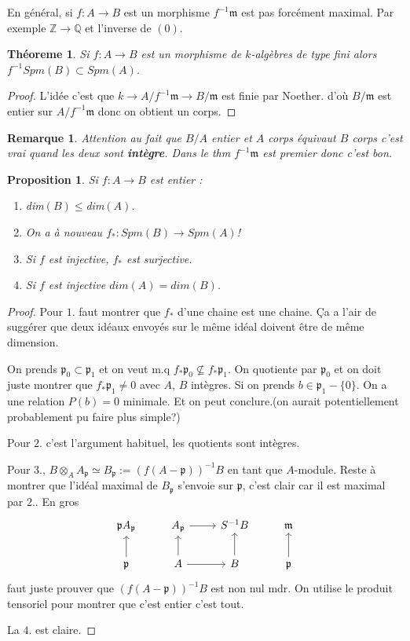 \documentclass[a4paper,12pt]{book}
\newcommand{\Z}{\mathbb{Z}}
\newcommand{\Q}{\mathbb{Q}}
\newcommand{\m}{\mathfrak{m}}
\newcommand{\p}{\mathfrak{p}}
\theoremstyle{plain}
\newtheorem{thm}[subsection]{Théoreme}
\newtheorem{prop}[subsection]{Proposition}
\newtheorem{rem}{Remarque}
\theoremstyle{definition}
\theoremstyle{remark}
\begin{document}
En général, si $f\colon A \to B$ est un morphisme
$f^{-1}\m$ est pas forcément maximal. Par exemple
$\Z\to \Q$ et l'inverse de $(0)$. 
\begin{thm}
    Si $f\colon A\to B$ est un morphisme de $k$-algèbres
    de type fini alors $f^{-1}Spm(B)\subset Spm(A)$.
\end{thm}
\begin{proof}
    L'idée c'est que $k\to A/f^{-1}\m\to B/\m$ est finie
    par Noether. d'où $B/\m$ est entier sur $A/f^{-1}\m$
    donc on obtient un corps.
\end{proof}
\begin{rem}
    Attention au fait que $B/A$ entier et $A$ corps équivaut $B$ corps
    c'est vrai quand les deux sont \textbf{intègre}. Dans le thm
    $f^{-1}\m$ est premier donc c'est bon.
\end{rem}
\begin{prop}
    Si $f\colon A\to B$ est entier :
    \begin{enumerate}
	\item dim$(B)\leq$dim$(A)$.
	\item On a à nouveau $f_*\colon Spm(B)\to Spm(A)$!
	\item Si $f$ est injective, $f_*$ est surjective.
	\item Si $f$ est injective $dim(A)=dim(B)$.
    \end{enumerate}
\end{prop}
\begin{proof}
    Pour $1.$ faut montrer que $f_*$ d'une chaine est une chaine.
    Ça a l'air de suggérer que deux idéaux envoyés sur le même idéal
    doivent être de même dimension.


    On prends $\p_0\subset \p_1$ et on veut m.q 
    $f_*\p_0\nsubseteq f_*\p_1$. On quotiente par $\p_0$ et on doit
    juste montrer que $f_* \p_1\ne 0$ avec $A$, $B$ intègres. Si 
    on prends $b\in \p_1-\{0\}$. On a une relation $P(b)=0$ minimale.
    Et on peut conclure.(on aurait potentiellement probablement pu faire
    plus simple?)

    Pour $2.$ c'est l'argument habituel, les quotients sont intègres.

    Pour $3.$, $B\otimes_A A_{\p}\simeq B_{\p}:=(f(A-\p))^{-1}B$ en tant
    que $A$-module. Reste à montrer que l'idéal maximal de $B_{\p}$
    s'envoie sur $\p$, c'est clair car il est maximal par $2.$. En gros
\[\begin{tikzcd}
	{\p A_{\p}} & {A_{\p}} & {S^{-1}B} & \m \\
	\p & A & B & \p
	\arrow[from=1-2, to=1-3]
	\arrow[from=2-1, to=1-1]
	\arrow[from=2-2, to=1-2]
	\arrow[from=2-2, to=2-3]
	\arrow[from=2-3, to=1-3]
	\arrow[from=2-4, to=1-4]
\end{tikzcd}\]
    faut juste prouver que $(f(A-\p))^{-1}B$ est non nul mdr. On utilise
    le produit tensoriel pour montrer que c'est entier c'est tout.

    La $4.$ est claire.
\end{proof}
\end{document}
